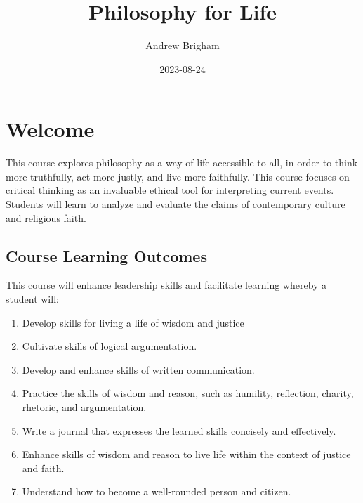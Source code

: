 \documentclass[
]{book}
\title{Philosophy for Life}
\author{Andrew Brigham}
\date{2023-08-24}
\providecommand{\tightlist}{%
  \setlength{\itemsep}{0pt}\setlength{\parskip}{0pt}}
\begin{document}
\maketitle

{
\setcounter{tocdepth}{1}
\tableofcontents
}
\hypertarget{welcome}{%
\chapter*{Welcome}\label{welcome}}

This course explores philosophy as a way of life accessible to all, in order to think more truthfully, act more justly, and live more faithfully. This course focuses on critical thinking as an invaluable ethical tool for interpreting current events. Students will learn to analyze and evaluate the claims of contemporary culture and religious faith.

\hypertarget{course-learning-outcomes}{%
\section*{Course Learning Outcomes}\label{course-learning-outcomes}}

This course will enhance leadership skills and facilitate learning whereby a student will:

\begin{enumerate}
\def\labelenumi{\arabic{enumi}.}
\tightlist
\item
  Develop skills for living a life of wisdom and justice\\
\item
  Cultivate skills of logical argumentation.\\
\item
  Develop and enhance skills of written communication.\\
\item
  Practice the skills of wisdom and reason, such as humility, reflection, charity, rhetoric, and argumentation.\\
\item
  Write a journal that expresses the learned skills concisely and effectively.\\
\item
  Enhance skills of wisdom and reason to live life within the context of justice and faith.\\
\item
  Understand how to become a well-rounded person and citizen.
\end{enumerate}
\end{document}
